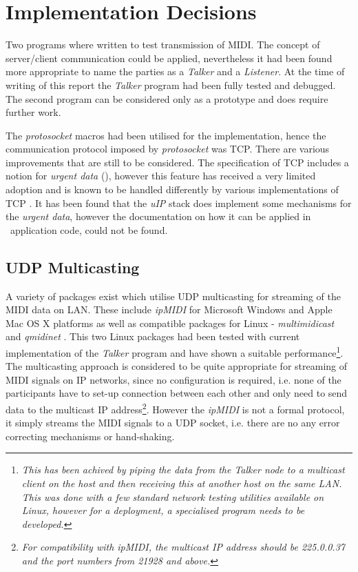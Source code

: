 \section{Implementation Decisions}

  Two programs where written to test transmission of MIDI. The concept of
 server/client communication could be applied, nevertheless it had been
 found more appropriate to name the parties as a \emph{Talker} and a
 \emph{Listener}. At the time of writing of this report the \emph{Talker}
 program had been fully tested and debugged. The second program can be
 considered only as a prototype and does require further work.

  The \emph{protosocket} macros had been utilised for the implementation,
 hence the communication protocol imposed by \emph{protosocket} was TCP.
 There are various improvements that are still to be considered.
 The specification of TCP includes a notion for \emph{urgent data}
 (), however this feature has received a very limited adoption
 and is known to be handled differently by various implementations of TCP
 \cite{ietf:draft:tcpm:urgdata}. It has been found that the \emph{uIP}
 stack does implement some mechanisms for the \emph{urgent data}, however
 the documentation on how it can be applied in \Contiki\ application code,
 could not be found. 


\subsection{UDP Multicasting}

  A variety of packages exist which utilise UDP multicasting for streaming
 of the MIDI data on LAN. These include \emph{ipMIDI} \cite{links:ipmidi} for
 Microsoft Windows and Apple Mac OS X platforms as well as compatible
 packages for Linux - \emph{multimidicast} \cite{links:multimidicast} and
 \emph{qmidinet} \cite{links:qmidinet}. This two Linux packages had been
 tested with current implementation of the \emph{Talker} program and have
 shown a suitable performance\footnote{\emph{This has been achived by
 piping the data from the Talker node to a multicast client on the host and
 then receiving this at another host on the same LAN. This was done with
 a few standard network testing utilities available on Linux, however for
 a deployment, a specialised program needs to be developed.}}. The multicasting
 approach is considered to be quite appropriate for streaming of MIDI signals
 on IP networks, since no configuration is required, i.e. none of the
 participants have to set-up connection between each other and only need
 to send data to the multicast IP address\footnote{\emph{For compatibility
 with ipMIDI, the multicast IP
 address should be 225.0.0.37 and the port numbers from 21928 and above.}}.
 However the \emph{ipMIDI} is not a formal protocol, it simply streams the
 MIDI signals to a UDP socket, i.e. there are no any error correcting
 mechanisms or hand-shaking.

